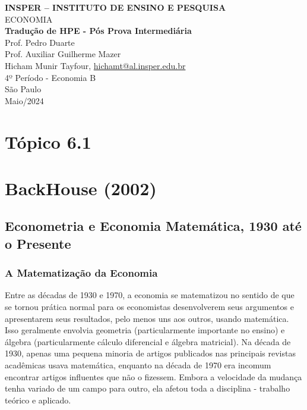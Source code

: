 \documentclass[12pt]{article}
\begin{document}
\begin{titlepage}
    \centering
    \vspace*{1cm}
    \Large\textbf{INSPER – INSTITUTO DE ENSINO E PESQUISA}\\
    \Large ECONOMIA\\
    \vspace{1.5cm}
    \Large\textbf{Tradução de HPE - Pós Prova Intermediária}\\
    \vspace{1.5cm}
    Prof. Pedro Duarte\\
    Prof. Auxiliar Guilherme Mazer\\
    \vfill
    \normalsize
    Hicham Munir Tayfour, \href{mailto:hichamt@al.insper.edu.br}{hichamt@al.insper.edu.br}\\
    4º Período - Economia B\\
    \vfill
    São Paulo\\
    Maio/2024
\end{titlepage}

\newpage
\tableofcontents
\thispagestyle{empty} %
\newpage
\setcounter{page}{1} %
\justify
\onehalfspacing

\pagestyle{fancy}
\fancyhf{}
\rhead{\thepage}

\newpage
\section*{\textbf{Tópico 6.1}}

\section{\textbf{BackHouse (2002)}}
\subsection{\textbf{Econometria e Economia Matemática, 1930 até o Presente}}
\subsubsection{\textbf{A Matematização da Economia}}

Entre as décadas de 1930 e 1970, a economia se matematizou no sentido de que se tornou prática normal para os economistas desenvolverem seus argumentos e apresentarem seus resultados, pelo menos uns aos outros, usando matemática. Isso geralmente envolvia geometria (particularmente importante no ensino) e álgebra (particularmente cálculo diferencial e álgebra matricial). Na década de 1930, apenas uma pequena minoria de artigos publicados nas principais revistas acadêmicas usava matemática, enquanto na década de 1970 era incomum encontrar artigos influentes que não o fizessem. Embora a velocidade da mudança tenha variado de um campo para outro, ela afetou toda a disciplina - trabalho teórico e aplicado.
\end{document}
